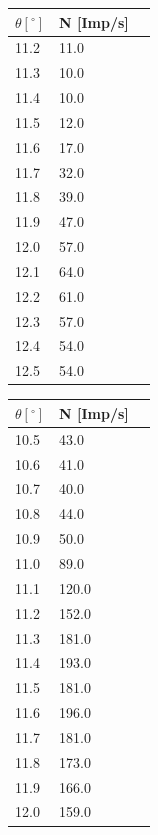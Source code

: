 \begin{minipage}{\linewidth}
    \begin{table}[H]
        \centering
    \begin{tabular}{lll}
        \toprule
        $\theta [^\circ]$ & N [Imp/s] \\
        \midrule
        11.2  &	11.0 \\
        11.3  &	10.0 \\
        11.4  &	10.0 \\
        11.5  &	12.0 \\
        11.6  &	17.0 \\
        11.7  &	32.0 \\
        11.8  &	39.0 \\
        11.9  &	47.0 \\
        12.0  &	57.0 \\
        12.1  &	64.0 \\
        12.2  &	61.0 \\
        12.3  &	57.0 \\
        12.4  &	54.0 \\
        12.5  &	54.0 \\
        \bottomrule   
    \end{tabular}
    
    \label{tab:5}
\end{table}
\end{minipage}

\begin{minipage}{\linewidth}
    \begin{table}[H]
        \centering
    \begin{tabular}{lll}
        \toprule
        $\theta [^\circ]$ & N [Imp/s] \\
        \midrule
        10.5  &	43.0  \\
        10.6  &	41.0  \\
        10.7  &	40.0  \\
        10.8  &	44.0  \\
        10.9  &	50.0  \\
        11.0  &	89.0  \\
        11.1  &	120.0 \\
        11.2  &	152.0 \\
        11.3  &	181.0 \\
        11.4  &	193.0 \\
        11.5  &	181.0 \\
        11.6  &	196.0 \\
        11.7  &	181.0 \\
        11.8  &	173.0 \\
        11.9  &	166.0 \\
        12.0  &	159.0 \\
        \bottomrule   
    \end{tabular}
    
    \label{tab:6}
\end{table}
\end{minipage}

